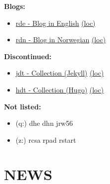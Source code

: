 \documentclass[
]{book}
\providecommand{\tightlist}{%
  \setlength{\itemsep}{0pt}\setlength{\parskip}{0pt}}
\begin{document}
\textbf{Blogs:}

\begin{itemize}
\tightlist
\item
  \href{https://dyrehaugen.github.io/rde}{rde - Blog in English} \href{http://localhost/rde}{(loc)}
\item
  \href{https://dyrehaugen.github.io/rdn}{rdn - Blog in Norwegian} \href{http://localhost/rdn}{(loc)}
\end{itemize}

\textbf{Discontinued:}

\begin{itemize}
\tightlist
\item
  \href{https://dyrehaugen.github.io/jdt}{jdt - Collection (Jekyll)} \href{http://localhost/jdt}{(loc)}
\item
  \href{https://dyrehaugen.github.io/hdt}{hdt - Collection (Hugo)} \href{http://localhost/hdt}{(loc)}
\end{itemize}

\textbf{Not listed:}

\begin{itemize}
\tightlist
\item
  (q:) dhe dhn jrw56
\item
  (z:) rcsa rpad rstart
\end{itemize}

\hypertarget{news}{%
\chapter{NEWS}\label{news}}

  
\end{document}
